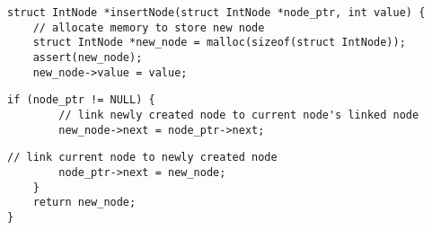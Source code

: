 \documentclass[10pt]{article}
\begin{document}


\small
\begin{tcolorbox}
\begin{lstlisting}[language=ExampleGray]
struct IntNode *insertNode(struct IntNode *node_ptr, int value) {
    // allocate memory to store new node
    struct IntNode *new_node = malloc(sizeof(struct IntNode));  
    assert(new_node);
    new_node->value = value;
\end{lstlisting}
\vspace*{-\baselineskip}
\begin{lstlisting}[language=Example]
    if (node_ptr != NULL) {
        // link newly created node to current node's linked node
        new_node->next = node_ptr->next;
\end{lstlisting}
\vspace*{-\baselineskip}
\begin{lstlisting}[language=ExampleGray]
        // link current node to newly created node
        node_ptr->next = new_node;
    }
    return new_node;
}
\end{lstlisting}
\end{tcolorbox}
\end{document}

